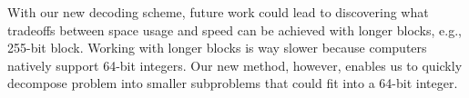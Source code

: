 With our new decoding scheme, future work could lead to discovering what tradeoffs
between space usage and speed can be achieved with longer blocks, e.g., 255-bit block.
Working with longer blocks is way slower because computers natively support 64-bit
integers. Our new method, however, enables us to quickly decompose problem into smaller
subproblems that could fit into a 64-bit integer.
